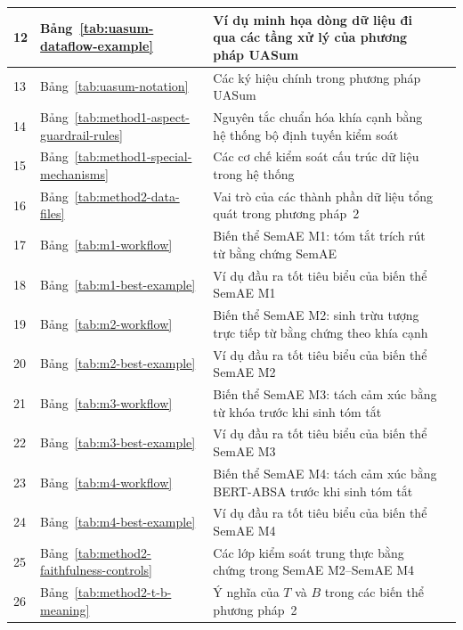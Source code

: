 \documentclass[12pt,a4paper]{report}
\begin{document}
\begin{longtable}{|p{}|p{}|p{}|p{}|}
12 & Bảng~\ref{tab:uasum-dataflow-example} & Ví dụ minh họa dòng dữ liệu đi qua các tầng xử lý của phương pháp UASum & \pageref{tab:uasum-dataflow-example} \\ \hline
13 & Bảng~\ref{tab:uasum-notation} & Các ký hiệu chính trong phương pháp UASum & \pageref{tab:uasum-notation} \\ \hline
14 & Bảng~\ref{tab:method1-aspect-guardrail-rules} & Nguyên tắc chuẩn hóa khía cạnh bằng hệ thống bộ định tuyến kiểm soát & \pageref{tab:method1-aspect-guardrail-rules} \\ \hline
15 & Bảng~\ref{tab:method1-special-mechanisms} & Các cơ chế kiểm soát cấu trúc dữ liệu trong hệ thống & \pageref{tab:method1-special-mechanisms} \\ \hline
16 & Bảng~\ref{tab:method2-data-files} & Vai trò của các thành phần dữ liệu tổng quát trong phương pháp~2 & \pageref{tab:method2-data-files} \\ \hline
17 & Bảng~\ref{tab:m1-workflow} & Biến thể SemAE M1: tóm tắt trích rút từ bằng chứng SemAE & \pageref{tab:m1-workflow} \\ \hline
18 & Bảng~\ref{tab:m1-best-example} & Ví dụ đầu ra tốt tiêu biểu của biến thể SemAE M1 & \pageref{tab:m1-best-example} \\ \hline
19 & Bảng~\ref{tab:m2-workflow} & Biến thể SemAE M2: sinh trừu tượng trực tiếp từ bằng chứng theo khía cạnh & \pageref{tab:m2-workflow} \\ \hline
20 & Bảng~\ref{tab:m2-best-example} & Ví dụ đầu ra tốt tiêu biểu của biến thể SemAE M2 & \pageref{tab:m2-best-example} \\ \hline
21 & Bảng~\ref{tab:m3-workflow} & Biến thể SemAE M3: tách cảm xúc bằng từ khóa trước khi sinh tóm tắt & \pageref{tab:m3-workflow} \\ \hline
22 & Bảng~\ref{tab:m3-best-example} & Ví dụ đầu ra tốt tiêu biểu của biến thể SemAE M3 & \pageref{tab:m3-best-example} \\ \hline
23 & Bảng~\ref{tab:m4-workflow} & Biến thể SemAE M4: tách cảm xúc bằng BERT-ABSA trước khi sinh tóm tắt & \pageref{tab:m4-workflow} \\ \hline
24 & Bảng~\ref{tab:m4-best-example} & Ví dụ đầu ra tốt tiêu biểu của biến thể SemAE M4 & \pageref{tab:m4-best-example} \\ \hline
25 & Bảng~\ref{tab:method2-faithfulness-controls} & Các lớp kiểm soát trung thực bằng chứng trong SemAE M2--SemAE M4 & \pageref{tab:method2-faithfulness-controls} \\ \hline
26 & Bảng~\ref{tab:method2-t-b-meaning} & Ý nghĩa của $T$ và $B$ trong các biến thể phương pháp~2 & \pageref{tab:method2-t-b-meaning} \\ \hline

\end{longtable}
\end{document}
